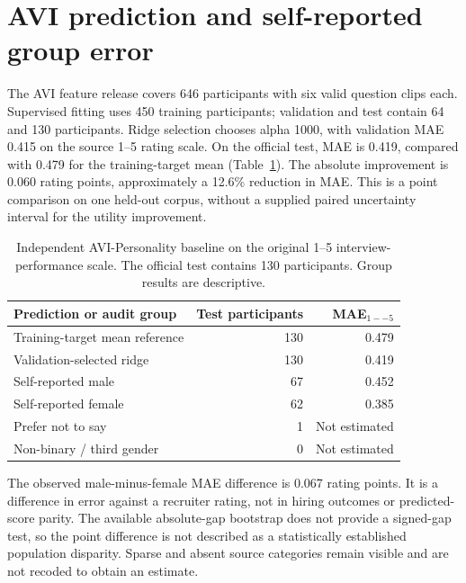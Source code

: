 \section{AVI prediction and self-reported group error}
\label{sec:avi-results}

The AVI feature release covers 646 participants with six valid question clips each.
Supervised fitting uses 450 training participants; validation and test contain 64 and
130 participants. Ridge selection chooses alpha 1000, with validation MAE 0.415 on
the source 1--5 rating scale. On the official test, MAE is 0.419, compared with 0.479
for the training-target mean (Table~\ref{tab:avi-baseline}). The absolute improvement
is 0.060 rating points, approximately a 12.6\% reduction in MAE. This is a point
comparison on one held-out corpus, without a supplied paired uncertainty interval for
the utility improvement.

\begin{table}[htbp]
\centering
\caption[AVI-Personality baseline and descriptive group errors]{Independent AVI-Personality baseline on the original 1--5 interview-performance
scale. The official test contains 130 participants. Group results are descriptive.}
\label{tab:avi-baseline}
\begin{tabular}{lrr}
\toprule
Prediction or audit group & Test participants & MAE$_{1--5}$ \\
\midrule
Training-target mean reference & 130 & 0.479 \\
Validation-selected ridge & 130 & 0.419 \\
\addlinespace
Self-reported male & 67 & 0.452 \\
Self-reported female & 62 & 0.385 \\
Prefer not to say & 1 & Not estimated \\
Non-binary / third gender & 0 & Not estimated \\
\bottomrule
\end{tabular}
\end{table}
\FloatBarrier

The observed male-minus-female MAE difference is 0.067 rating points. It is a difference
in error against a recruiter rating, not in hiring outcomes or predicted-score parity.
The available absolute-gap bootstrap does not provide a signed-gap test, so the point
difference is not described as a statistically established population disparity. Sparse
and absent source categories remain visible and are not recoded to obtain an estimate.

